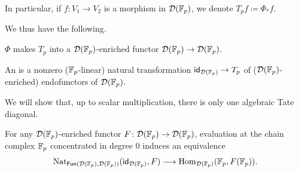 In particular, if \(f \colon V_1 \to V_2\) is a morphism in \(\mathcal{D}({\mathbb{F}_p})\), we denote \(T_p f \coloneqq \Phi_*f\).

We thus have the following.
\begin{lemma}
	\(\Phi\) makes \(T_p\) into a \(\mathcal{D}({\mathbb{F}_p})\)-enriched functor \(\mathcal{D}({\mathbb{F}_p}) \to \mathcal{D}({\mathbb{F}_p})\).
\end{lemma}



\begin{definition}
	An  is a nonzero (\({\mathbb{F}_p}\)-linear) natural transformation \(\mathsf{id}_{\mathcal{D}({\mathbb{F}_p})} \to T_p\) of (\(\mathcal{D}({\mathbb{F}_p})\)-enriched) endofunctors of \(\mathcal{D}({\mathbb{F}_p})\).
\end{definition}

We will show that, up to scalar multiplication, there is only one algebraic Tate diagonal.

\begin{proposition}\label{DFpclassification}
	For any \(\mathcal{D}({\mathbb{F}_p})\)-enriched functor \(F \colon \mathcal{D}({\mathbb{F}_p}) \to \mathcal{D}({\mathbb{F}_p})\), evaluation at the chain complex \({\mathbb{F}_p}\) concentrated in degree \(0\) induces an equivalence
	\[
	\operatorname{Nat}_{\mathsf{Fun}(\mathcal{D}({\mathbb{F}_p}),\mathcal{D}({\mathbb{F}_p}))}(\mathsf{id}_{\mathcal{D}({\mathbb{F}_p})},F) \longrightarrow \mathrm{Hom}_{\mathcal{D}({\mathbb{F}_p})}({\mathbb{F}_p},F({\mathbb{F}_p})).
	\]
\end{proposition}

